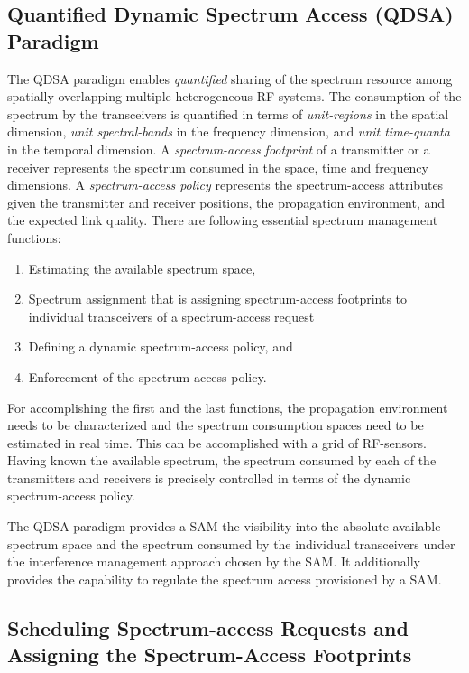 \documentclass[12pt, draftclsnofoot, onecolumn]{IEEEtran}
\begin{document}
\subsection{Quantified Dynamic Spectrum Access (QDSA) Paradigm}
The QDSA paradigm enables \textit{quantified} sharing of the spectrum resource among spatially overlapping multiple heterogeneous RF-systems. The consumption of the spectrum by the transceivers is quantified in terms of \textit{unit-regions} in the spatial dimension, \textit{unit spectral-bands} in the frequency dimension, and \textit{unit time-quanta} in the temporal dimension. A \textit{spectrum-access footprint} of a transmitter or a receiver represents the spectrum consumed in the space, time and frequency dimensions. A \textit{spectrum-access policy} represents the spectrum-access attributes given the transmitter and receiver positions, the propagation environment, and the expected link quality. There are following essential spectrum management functions:
\begin{enumerate}
	\item Estimating the available spectrum space,
	\item Spectrum assignment that is assigning spectrum-access footprints to individual transceivers of a spectrum-access request
	\item Defining a dynamic spectrum-access policy, and
	\item Enforcement of the spectrum-access policy.
\end{enumerate}

For accomplishing the first and the last functions, the propagation environment needs to be characterized and the spectrum consumption spaces need to be estimated in real time. This can be accomplished with a grid of RF-sensors. Having known the available spectrum, the spectrum consumed by each of the transmitters and receivers is precisely controlled in terms of the dynamic spectrum-access policy.

The QDSA paradigm provides a SAM the visibility into the absolute available spectrum space and the spectrum consumed by the individual transceivers under the interference management approach chosen by the SAM. It additionally provides the capability to regulate the spectrum access provisioned by a SAM.

\subsection{Scheduling Spectrum-access Requests and Assigning the Spectrum-Access Footprints}
\end{document}
